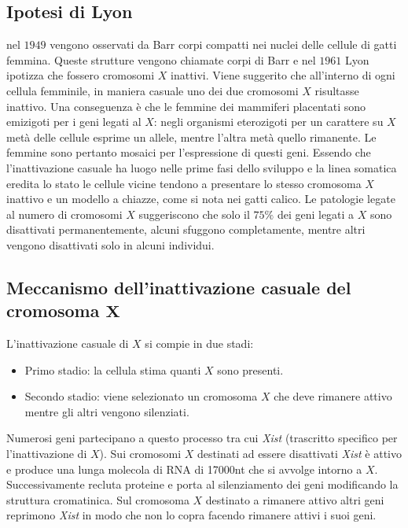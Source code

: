 	\subsection{Ipotesi di Lyon}
	nel $1949$ vengono osservati da Barr corpi compatti nei nuclei delle cellule di gatti femmina.
	Queste strutture vengono chiamate corpi di Barr e nel $1961$ Lyon ipotizza che fossero cromosomi $X$ inattivi.
	Viene suggerito che all'interno di ogni cellula femminile, in maniera casuale uno dei due cromosomi $X$ risultasse inattivo.
	Una conseguenza \`e che le femmine dei mammiferi placentati sono emizigoti per i geni legati al $X$: negli organismi eterozigoti per un carattere su $X$ met\`a delle cellule esprime un allele, mentre l'altra met\`a quello rimanente.
	Le femmine sono pertanto mosaici per l'espressione di questi geni.
	Essendo che l'inattivazione casuale ha luogo nelle prime fasi dello sviluppo e la linea somatica eredita lo stato le cellule vicine tendono a presentare lo stesso cromosoma $X$ inattivo e un modello a chiazze, come si nota nei gatti calico.
	Le patologie legate al numero di cromosomi $X$ suggeriscono che solo il $75\%$ dei geni legati a $X$ sono disattivati permanentemente, alcuni sfuggono completamente, mentre altri vengono disattivati solo in alcuni individui.

	\subsection{Meccanismo dell'inattivazione casuale del cromosoma $\mathbf{X}$}
	L'inattivazione casuale di $X$ si compie in due stadi:
	\begin{itemize}
		\item Primo stadio: la cellula stima quanti $X$ sono presenti.
		\item Secondo stadio: viene selezionato un cromosoma $X$ che deve rimanere attivo mentre gli altri vengono silenziati.
	\end{itemize}
	Numerosi geni partecipano a questo processo tra cui \emph{Xist} (trascritto specifico per l'inattivazione di $X$).
	Sui cromosomi $X$ destinati ad essere disattivati \emph{Xist} \`e attivo e produce una lunga molecola di RNA di \num{17000}\si{nt} che si avvolge intorno a $X$.
	Successivamente recluta proteine e porta al silenziamento dei geni modificando la struttura cromatinica.
	Sul cromosoma $X$ destinato a rimanere attivo altri geni reprimono \emph{Xist} in modo che non lo copra facendo rimanere attivi i suoi geni.
